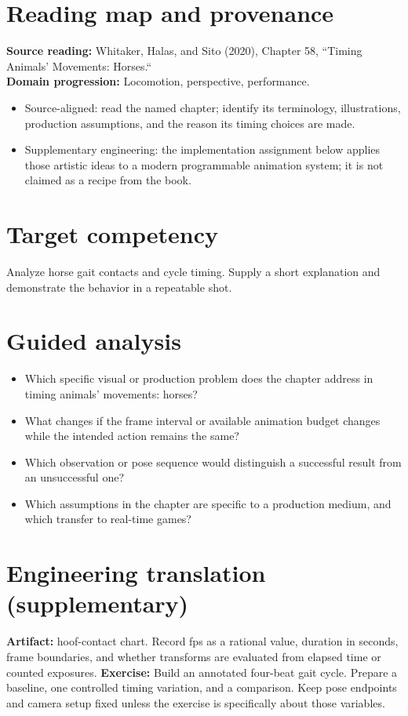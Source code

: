 \documentclass[10pt,letterpaper]{article}
\begin{document}
\makedoctitle
\makedocsummary

\section{Reading map and provenance}
\textbf{Source reading:} Whitaker, Halas, and Sito (2020), Chapter 58, ``Timing Animals’ Movements: Horses.``\\
\textbf{Domain progression:} Locomotion, perspective, performance.
\begin{itemize}
\item Source-aligned: read the named chapter; identify its terminology, illustrations, production assumptions, and the reason its timing choices are made.
\item Supplementary engineering: the implementation assignment below applies those artistic ideas to a modern programmable animation system; it is not claimed as a recipe from the book.
\end{itemize}
\section{Target competency}
Analyze horse gait contacts and cycle timing. Supply a short explanation and demonstrate the behavior in a repeatable shot.
\section{Guided analysis}
\begin{itemize}
\item Which specific visual or production problem does the chapter address in timing animals’ movements: horses?
\item What changes if the frame interval or available animation budget changes while the intended action remains the same?
\item Which observation or pose sequence would distinguish a successful result from an unsuccessful one?
\item Which assumptions in the chapter are specific to a production medium, and which transfer to real-time games?
\end{itemize}
\section{Engineering translation (supplementary)}
\textbf{Artifact:} hoof-contact chart. Record fps as a rational value, duration in seconds, frame boundaries, and whether transforms are evaluated from elapsed time or counted exposures.
\textbf{Exercise:} Build an annotated four-beat gait cycle. Prepare a baseline, one controlled timing variation, and a comparison. Keep pose endpoints and camera setup fixed unless the exercise is specifically about those variables.
\end{document}
